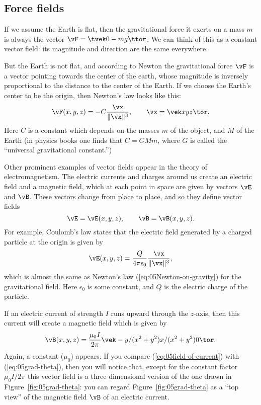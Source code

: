 \subsection{Force fields}   
If we assume the Earth is flat, then the gravitational force it exerts on a
mass $m$ is always the vector $\vF = \tvek 0 \\ -mg\ttor$.   We can think of
this as a constant vector field: its magnitude and direction are the same
everywhere.

But the Earth is not flat, and according to Newton the gravitational force
$\vF$ is a vector pointing towards the center of the earth, whose magnitude
is inversely proportional to the distance to the center of the Earth.   If
we choose the Earth's center to be the origin, then Newton's law looks like
this:
\begin{equation}
  \label{eq:05Newton-on-gravity}
  \vF(x, y, z) = -C \frac{\vx}{\|\vx\|^3}, \qquad \vx = \vek x\\y\\z\tor.
\end{equation}
%
Here $C$ is a constant which depends on the masses $m$ of the object, and
$M$ of the Earth (in physics books one finds that $C= GMm$, where $G$ is
called the ``universal gravitational constant.'')

Other prominent examples of vector fields appear in the theory of
electromagnetism.   The electric currents and charges around us create an
electric field and a magnetic field, which at each point in space are given
by vectors $\vE$ and $\vB$.   These vectors change from place to place, and
so they define vector fields
\[
\vE = \vE(x, y, z), \qquad \vB=\vB(x, y, z).
\]
For example, Coulomb's law states that the electric field generated by a
charged particle at the origin is given by
\begin{equation}
  \label{eq:05coulombs-law}
  \vE(x, y, z) = \frac{Q} {4\pi\epsilon_0} \frac{\vx} {\|\vx\|^3},
\end{equation}
which is almost the same as Newton's law (\ref{eq:05Newton-on-gravity}) for
the gravitational field.   Here $\epsilon_0$ is some constant, and $Q$ is the
electric charge of the particle.

If an electric current of strength $I$ runs upward through the $z$-axis,
then this current will create a magnetic field which is given by
\begin{equation}
  \label{eq:05field-of-current}
  \vB(x, y, z) = \frac{\mu_0 I} {2\pi}
  \vek -y/(x^2+y^2) \\ x/(x^2+y^2) \\ 0 \tor.
\end{equation}
Again, a constant ($\mu_0$) appears.   If you compare
(\ref{eq:05field-of-current}) with (\ref{eq:05grad-theta}), then you will
notice that, except for the constant factor $\mu_0 I /2\pi$ this vector
field is a three dimensional version of the one drawn in
Figure~\ref{fig:05grad-theta}: you can regard Figure~\ref{fig:05grad-theta}
as a ``top view'' of the magnetic field $\vB$ of an electric current.

